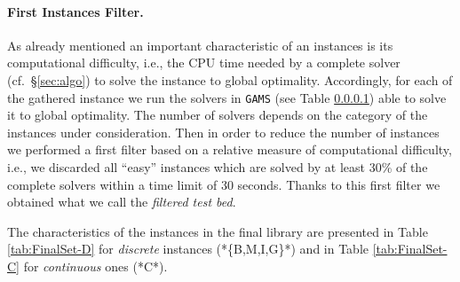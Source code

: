\paragraph{First Instances Filter.} As already mentioned an important characteristic of an instances is its computational difficulty, i.e., the CPU time needed by a complete solver (cf.~\S \ref{sec:algo}) to solve the instance to global optimality. Accordingly, for each of the gathered instance we run the solvers in {\tt GAMS} (see Table \ref{}) able to solve it to global optimality. The number of solvers depends on the category of the instances under consideration. Then in order to reduce the number of instances we performed a first filter based on a relative measure of computational difficulty, i.e., we discarded all ``easy'' instances which are solved by at least 30\% of the complete solvers within a time limit of 30 seconds. Thanks to this first filter we obtained what we call the {\it filtered test bed}.



\bigskip
The characteristics of the instances in the final library are presented in Table \ref{tab:FinalSet-D} for \emph{discrete} instances (*\{B,M,I,G\}*) and in Table \ref{tab:FinalSet-C} for \emph{continuous} ones (*C*).

